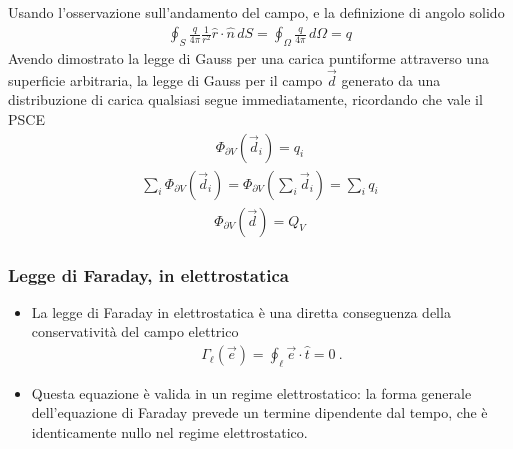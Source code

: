 \documentclass[letterpaper,10pt,italian]{jupyterBook}
\begin{document}
\sphinxAtStartPar
{}
Usando l’osservazione sull’andamento del campo, e la definizione di angolo solido
\begin{equation*}
\begin{split}\oint_S \frac{q}{4 \pi} \frac{1}{r^2} \hat{r} \cdot \hat{n} \, dS =
\oint_{\Omega} \frac{q}{4 \pi}  \, d \Omega = q \end{split}
\end{equation*}
\sphinxAtStartPar
{}
Avendo dimostrato la legge di Gauss per una carica puntiforme attraverso una superficie arbitraria, la legge di Gauss per il campo \(\vec{d}\) generato da una distribuzione di carica qualsiasi segue immediatamente, ricordando che vale il PSCE
\begin{equation*}
\begin{split}\Phi_{\partial V}(\vec{d}_i) = q_i\end{split}
\end{equation*}\begin{equation*}
\begin{split}\sum_i \Phi_{\partial V}(\vec{d}_i) = \Phi_{\partial V} \left(\sum_i \vec{d}_i \right) = \sum_i q_i\end{split}
\end{equation*}\begin{equation*}
\begin{split}\Phi_{\partial V}(\vec{d}) = Q_V\end{split}
\end{equation*}

\subsubsection{Legge di Faraday, in elettrostatica}
\label{\detokenize{ch/electromagnetism/electrostatics:legge-di-faraday-in-elettrostatica}}\label{\detokenize{ch/electromagnetism/electrostatics:physics-hs-electromagnetism-electrostatics-maxwell-faraday}}\begin{itemize}
\item {} 
\sphinxAtStartPar
La legge di Faraday in elettrostatica è una diretta conseguenza della conservatività del campo elettrico
\begin{equation*}
\begin{split}\Gamma_{\ell}(\vec{e}) = \oint_{\ell} \vec{e} \cdot \hat{t} = 0 \ .\end{split}
\end{equation*}
\item {} 
\sphinxAtStartPar
Questa equazione è valida  in un regime elettrostatico: la forma generale dell’equazione di Faraday prevede un termine dipendente dal tempo, che è identicamente nullo nel regime elettrostatico.

\end{itemize}
\end{document}
